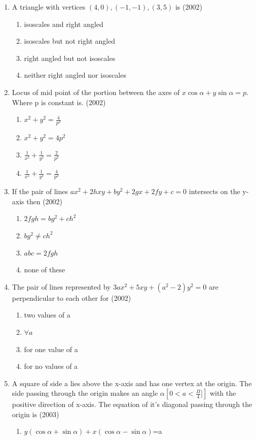 \documentclass[12pt]{article}
\begin{document}
\begin{enumerate}
\item A triangle with vertices $(4,0),(-1,-1 ),(3,5)$ is (2002)
\begin{enumerate}
\item isoscales and right angled
\item isoscales  but not right angled
\item right angled but not isoscales 
\item neither right angled nor isoscales 
\end{enumerate}
\item Locus of mid point of the portion between the axes of $x\cos\alpha+y\sin\alpha=p$. Where p is constant is. (2002)
\begin{enumerate}
\item $x^2+y^2=\frac{4}{p^2}$ 
\item $x^2+y^2=4p^2$
\item$\frac{1}{x^2}+\frac{1}{y^2}=\frac{2}{p^2}$ 
\item $\frac{1}{x^2}+\frac{1}{y^2}=\frac{4}{p^2}$ 
\end{enumerate}
\item If the pair of lines $ax^2+2hxy+by^2+2gx+2fy+c=0$ intersects on the y-axis then (2002)
\begin{enumerate}
\item $2fgh=bg^2+ch^2$ 
\item $bg^2\neq ch^2$
\item $abc=2fgh$
\item none of these
\end{enumerate}
\item The pair of lines represented by $3ax^2+5xy+(a^2-2)y^2=0$ are perpendicular to each other for (2002)
\begin{enumerate}
\item two values of a 
\item $\forall a$
\item for one value of a 
\item for no values of a
\end{enumerate}
\item A square of side a lies above the x-axis and has one vertex at the origin. The side passing through the origin makes an angle $\alpha \left[ 0<a<\frac{\Pi}{4}]\right]$ with the positive direction of x-axis. The equation of it's diagonal passing through the origin is (2003)
\begin{enumerate}
\item $y(\cos\alpha+\sin\alpha)+x(\cos\alpha-\sin\alpha)$=a

\end{enumerate}
\end{enumerate}
\end{document}
